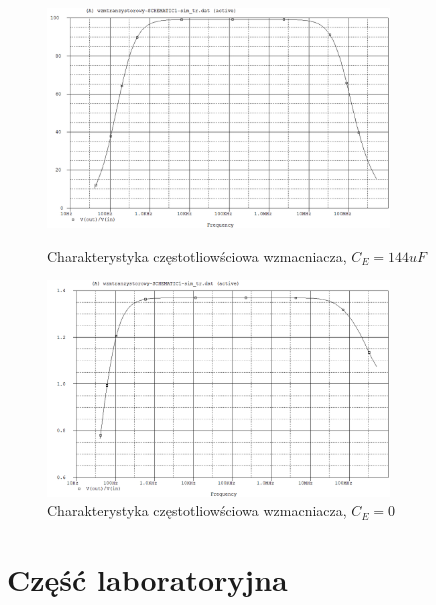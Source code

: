 \documentclass[a4paper,12pt]{article}
\begin{document}
\begin{figure}[h]
  \center
  \includegraphics[width=0.81\textwidth]{sim1.png}
  \caption{Charakterystyka częstotliowściowa wzmacniacza, $C_E = 144uF$}
  
    \includegraphics[width=0.81\textwidth]{sim2.png}
  \caption{Charakterystyka częstotliowściowa wzmacniacza, $C_E = 0$}
\end{figure}


\pagebreak
\section{Część laboratoryjna}
\end{document}
